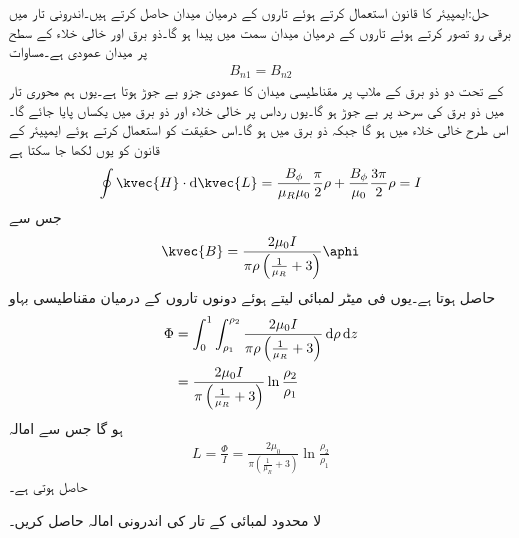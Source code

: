 حل:ایمپیئر کا قانون استعمال کرتے ہوئے تاروں کے درمیان میدان حاصل کرتے ہیں۔اندرونی تار میں برقی رو  تصور کرتے ہوئے تاروں کے درمیان میدان  سمت میں پیدا ہو گا۔ذو برق اور خالی خلاء کے سطح پر میدان عمودی ہے۔مساوات 
\begin{align*}
B_{n1}=B_{n2}
\end{align*}
 کے تحت دو ذو برق کے ملاپ پر مقناطیسی میدان کا عمودی جزو بے جوڑ ہوتا ہے۔یوں ہم محوری تار میں ذو برق کی سرحد پر  بے جوڑ ہو گا۔یوں رداس  پر خالی خلاء اور ذو برق میں یکساں  پایا جائے گا۔اس طرح خالی خلاء میں  ہو گا جبکہ ذو برق میں  ہو گا۔اس حقیقت کو استعمال کرتے ہوئے ایمپیئر کے قانون کو یوں لکھا جا سکتا ہے
\begin{align*}
\oint \kvec{H} \cdot \dif \kvec{L}=\frac{B_{\phi}}{\mu_R \mu_0} \frac{\pi}{2} \rho+\frac{B_{\phi}}{\mu_0} \frac{3\pi}{2} \rho=I
\end{align*} 
جس سے 
\begin{align*}
\kvec{B}=\frac{2\mu_0 I}{\pi \rho \left(\frac{1}{\mu_R}+3\right)} \aphi
\end{align*}
حاصل ہوتا ہے۔یوں فی میٹر لمبائی لیتے ہوئے دونوں تاروں کے درمیان مقناطیسی بہاو
\begin{align*}
\Phi&=\int_0^{1} \int_{\rho_1}^{\rho_2} \frac{2\mu_0 I}{\pi \rho \left(\frac{1}{\mu_R}+3\right)} \dif \rho \dif z\\
&=\frac{2\mu_0 I}{\pi  \left(\frac{1}{\mu_R}+3\right)} \ln \frac{\rho_2}{\rho_1}
\end{align*}
ہو گا جس سے امالہ
\begin{align*}
L=\frac{\Phi}{I}=\frac{2\mu_0}{\pi  \left(\frac{1}{\mu_R}+3\right)} \ln \frac{\rho_2}{\rho_1}
\end{align*}
حاصل ہوتی ہے۔

لا محدود لمبائی کے تار کی اندرونی امالہ حاصل کریں۔

